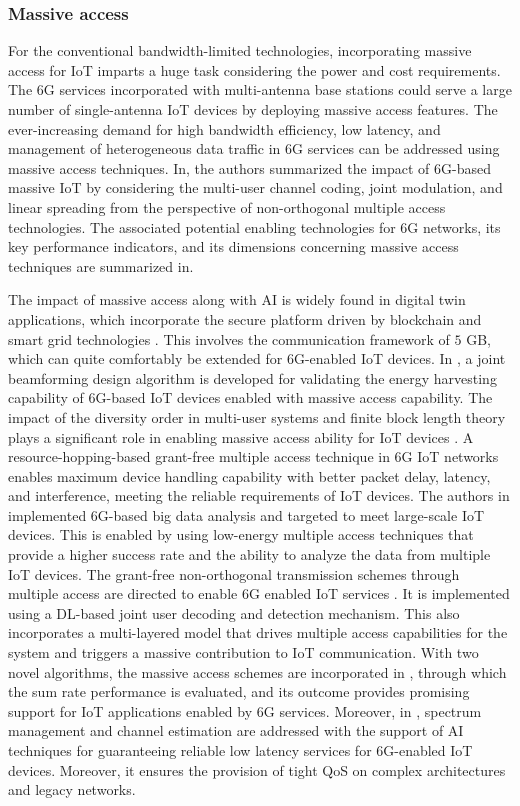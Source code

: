 \documentclass[journal]{IEEEtran}
\begin{document}
\subsubsection{Massive access} 
For the conventional bandwidth-limited technologies, incorporating massive access for IoT imparts a huge task considering the power and cost requirements. The 6G services incorporated with multi-antenna base stations could serve a large number of single-antenna IoT devices by deploying massive access features. The ever-increasing demand for high bandwidth efficiency, low latency, and management of heterogeneous data traffic in 6G services can be addressed using massive access techniques. In\cite{yuan2021noma}, the authors summarized the impact of 6G-based massive IoT by considering the multi-user channel coding, joint modulation, and linear spreading from the perspective of non-orthogonal multiple access technologies. The associated potential enabling technologies for 6G networks, its key performance indicators, and its dimensions concerning massive access techniques are summarized in\cite{akhtar2020shift}. 

The impact of massive access along with AI is widely found in digital twin applications, which incorporate the secure platform driven by blockchain and smart grid technologies \cite{lopez2021digital}. This involves the communication framework of $5$ GB, which can quite comfortably be extended for 6G-enabled IoT devices. In \cite{qi2020integration}, a joint beamforming design algorithm is developed for validating the energy harvesting capability of 6G-based IoT devices enabled with massive access capability. The impact of the diversity order in multi-user systems and finite block length theory plays a significant role in enabling massive access ability for IoT devices \cite{yuan2021noma}. A resource-hopping-based grant-free multiple access technique \cite{jang2021resource} in 6G IoT networks enables maximum device handling capability with better packet delay, latency, and interference, meeting the reliable requirements of IoT devices. The authors in \cite{lv2021big} implemented 6G-based big data analysis and targeted to meet large-scale IoT devices. This is enabled by using low-energy multiple access techniques that provide a higher success rate and the ability to analyze the data from multiple IoT devices. The grant-free non-orthogonal transmission schemes through multiple access are directed to enable 6G enabled IoT services \cite{abbas2020grant}. It is implemented using a DL-based joint user decoding and detection mechanism. This also incorporates a multi-layered model that drives multiple access capabilities for the system and triggers a massive contribution to IoT communication. With two novel algorithms, the massive access schemes are incorporated in \cite{mursia2020risma}, through which the sum rate performance is evaluated, and its outcome provides promising support for IoT applications enabled by 6G services. Moreover, in \cite{du2020machine}, spectrum management and channel estimation are addressed with the support of AI techniques for guaranteeing reliable low latency services for 6G-enabled IoT devices. Moreover, it ensures the provision of tight QoS on complex architectures and legacy networks.
\end{document}
